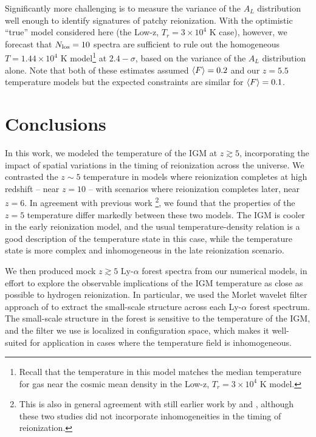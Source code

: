 Significantly more challenging is to measure the variance of the $A_L$ distribution well enough to identify signatures of patchy
reionization. With the optimistic ``true'' model considered here (the Low-z, $T_r=3 \times 10^4$ K case), however, we forecast that
$N_{\rm los}=10$ spectra are sufficient to rule out the homogeneous $T=1.44 \times 10^4$ K model\footnote{Recall that the temperature in this model matches the median temperature for gas near the cosmic mean density in the Low-z, $T_r=3 \times 10^4$ K model.} at $2.4-\sigma$, based on the variance of the $A_L$ distribution alone. Note that both of these estimates assumed $\langle F \rangle=0.2$ and our $z=5.5$ temperature models but the
expected constraints are similar for $\langle F \rangle=0.1$.

  

\section{Conclusions}
\label{sec:conclusions}

In this work, we modeled the temperature of the IGM at $z \gtrsim 5$, incorporating the impact of spatial
variations in the timing of reionization across the universe. We contrasted the $z \sim 5$ temperature in models
where reionization completes at high redshift -- near $z=10$ -- with scenarios where reionization completes
later, near $z = 6$. In agreement with previous work \citep{Trac:2008yz,Furlanetto:2009kr}\footnote{This is also
in general agreement with still earlier work by 
\citealt{Theuns:2002yc} and \citealt{Hui:2003hn}, although these two studies did not incorporate inhomogeneities in the
timing of reionization.}, we found
that the properties of the $z=5$ temperature differ markedly between these two models. The IGM is cooler in the
early reionization model, and the usual temperature-density relation is a good description of the temperature
state in this case, while the temperature state is more complex and inhomogeneous in the late reionization scenario.

We then produced mock $z \gtrsim 5$ Ly-$\alpha$ forest spectra from our numerical models, in effort to explore
the observable implications of the IGM temperature as close as possible to hydrogen reionization. In particular,
we used the Morlet wavelet filter approach of \citet{Lidz:2009ca} to extract the small-scale structure across
each Ly-$\alpha$ forest spectrum. The small-scale structure in the forest is sensitive to the temperature of the IGM,
and the filter we use is localized in configuration space, which makes it well-suited for application in cases
where the temperature field is inhomogeneous. 

